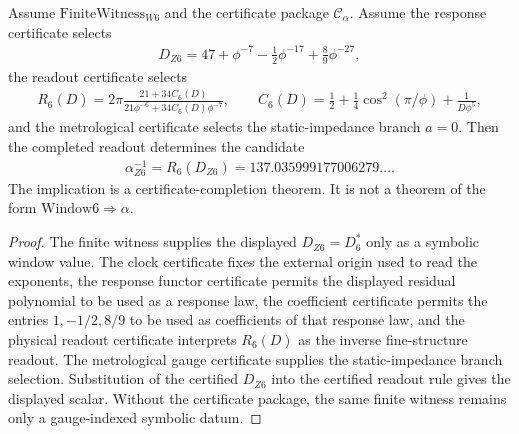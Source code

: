 \begin{theorem}
\label{thm:window6-alpha-certificate-completion}
Assume $\mathrm{FiniteWitness}_{W6}$ and the certificate package $\mathcal{C}_{\alpha}$.  Assume the response certificate selects
$$
\begin{aligned}
D_{Z6}
=
47+\phi^{-7}-\frac{1}{2}\phi^{-17}+\frac{8}{9}\phi^{-27},
\end{aligned}
$$
the readout certificate selects
$$
\begin{aligned}
R_6(D)
=
2\pi
\frac{21+34C_6(D)}
{21\phi^{-6}+34C_6(D)\phi^{-7}},
\qquad
C_6(D)
=
\frac{1}{2}+\frac{1}{4}\cos^2(\pi/\phi)+\frac{1}{D\phi^5},
\end{aligned}
$$
and the metrological certificate selects the static-impedance branch $a=0$.  Then the completed readout determines the candidate
$$
\begin{aligned}
\alpha_{Z6}^{-1}
=R_6(D_{Z6})
=137.035999177006279\ldots .
\end{aligned}
$$
The implication is a certificate-completion theorem.  It is not a theorem of the form $\mathrm{Window6}\Rightarrow \alpha$.
\end{theorem}

\begin{proof}
The finite witness supplies the displayed $D_{Z6}=D_6^{*}$ only as a symbolic window value.  The clock certificate fixes the external origin used to read the exponents, the response functor certificate permits the displayed residual polynomial to be used as a response law, the coefficient certificate permits the entries $1,-1/2,8/9$ to be used as coefficients of that response law, and the physical readout certificate interprets $R_6(D)$ as the inverse fine-structure readout.  The metrological gauge certificate supplies the static-impedance branch selection.  Substitution of the certified $D_{Z6}$ into the certified readout rule gives the displayed scalar.  Without the certificate package, the same finite witness remains only a gauge-indexed symbolic datum.
\end{proof}

